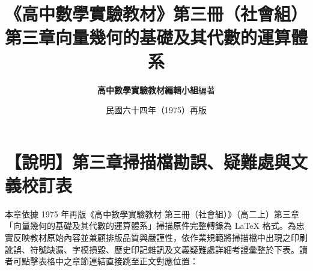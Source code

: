 \documentclass[a4paper,12pt,twoside]{article}
\title{\LARGE\textbf{《高中數學實驗教材》第三冊（社會組）}\\[0.5em] \Large\textbf{第三章\quad 向量幾何的基礎及其代數的運算體系}}
\author{\textbf{高中數學實驗教材編輯小組}\quad 編著}
\date{民國六十四年（1975）再版}
\begin{document}
\maketitle
\thispagestyle{firstpage}

\section*{【說明】第三章掃描檔勘誤、疑難處與文義校訂表}
\label{sec:errata_notes_b3_ch3}
\label{sec:current_errata}

本章依據 1975 年再版《高中數學實驗教材 第三冊（社會組）》（高二上）第三章「向量幾何的基礎及其代數的運算體系」掃描原件完整轉錄為 \LaTeX{} 格式。為忠實反映教材原始內容並兼顧排版品質與嚴謹性，依作業規範將掃描檔中出現之印刷訛誤、符號缺漏、字模損毀、歷史印記雜訊及文義疑難處詳細考證彙整於下表。讀者可點擊表格中之章節連結直接跳至正文對應位置：
\end{document}

